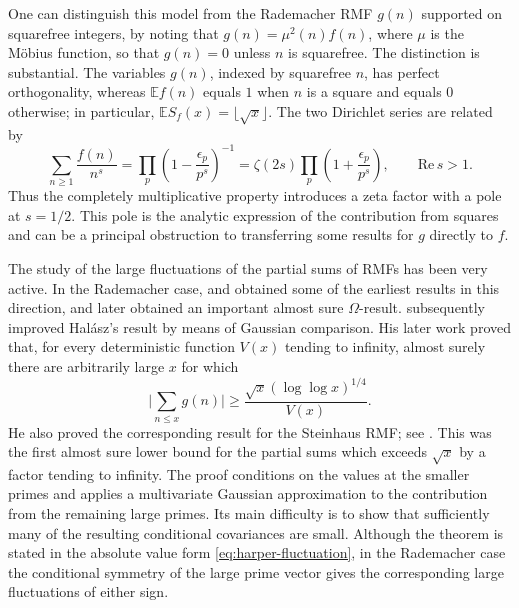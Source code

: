 \documentclass[a4paper,12pt,reqno]{amsart}
\numberwithin{equation}{section}
\theoremstyle{remark}
\newcommand{\E}{\mathbb{E}}
\begin{document}
One can distinguish this model from the Rademacher
RMF $g(n)$ supported on squarefree integers, by noting that $g(n)=\mu^2(n)f(n)$, where $\mu$ is the M\"obius function, so
that $g(n)=0$ unless $n$ is squarefree.
The distinction is substantial. The variables $g(n)$, indexed by squarefree
$n$, has perfect orthogonality, whereas
$\E f(n)$ equals $1$ when $n$ is a square and equals $0$ otherwise; in
particular, $\E S_f(x)=\lfloor\sqrt x\rfloor$. The two Dirichlet series are
related by
\begin{equation}\label{eq:euler-factorisation-intro}
 \sum_{n\geq1}\frac{f(n)}{n^s}
 =\prod_p\left(1-\frac{\epsilon_p}{p^s}\right)^{-1}
 =\zeta(2s)\prod_p\left(1+\frac{\epsilon_p}{p^s}\right),
 \qquad \mathrm{Re}\,s>1.
\end{equation}
Thus the completely multiplicative  property introduces a  zeta factor with a pole at $s=1/2$. This pole is the analytic expression of the contribution from squares and can be a principal obstruction to transferring some 
results for $g$ directly to $f$.

The study of the large fluctuations of the partial sums of RMFs has been very active.
{In the Rademacher case, \citet{Wintner1944} and \citet{Erdos1985} obtained some of the earliest results in this direction, and \citet{Halasz1983} later obtained an important almost sure $\Omega$-result.}
\citet{Harper2013Gaussian} {subsequently improved Hal\'asz's result} by means of Gaussian comparison.
His later work proved that, for every deterministic function $V(x)$ tending to
infinity, almost surely there are arbitrarily large $x$ for which
\begin{equation}\label{eq:harper-fluctuation}
 \bigg|\sum_{n\leq x}g(n)\bigg|
 \geq
 \frac{\sqrt{x}(\log\log x)^{1/4}}{V(x)}.
\end{equation}
He also proved the corresponding result for the Steinhaus RMF; see
\cite{Harper2023Large}.  This was the first almost sure lower bound for
the partial sums which exceeds $\sqrt{x}$ by a factor tending to infinity.
The proof conditions on the values at the smaller primes and applies a
multivariate Gaussian approximation to the contribution from the remaining
large primes.  Its main difficulty is to show that sufficiently many of
the resulting conditional covariances are small.  Although the theorem is
stated in the absolute value form \eqref{eq:harper-fluctuation}, in the
Rademacher case the conditional symmetry of the large prime vector gives
the corresponding large fluctuations of either sign.
\end{document}
